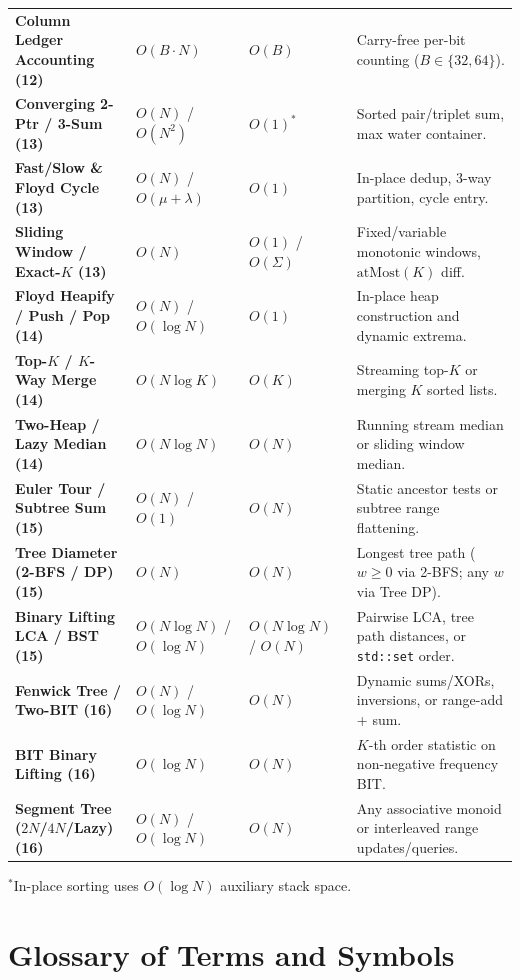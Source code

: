 \documentclass[11pt,a4paper]{article}
\begin{document}
\begin{xltabular}{\textwidth}{>{\raggedright\arraybackslash\bfseries}p{3.8cm} >{\centering\arraybackslash}p{2.6cm} >{\centering\arraybackslash}p{2.2cm} >{\raggedright\arraybackslash}X}
Column Ledger Accounting (12) & $O(B \cdot N)$ & $O(B)$ & Carry-free per-bit counting ($B \in \{32, 64\}$). \\
Converging 2-Ptr / 3-Sum (13) & $O(N)$ / $O(N^2)$ & $O(1)^*$ & Sorted pair/triplet sum, max water container. \\
Fast/Slow \& Floyd Cycle (13) & $O(N)$ / $O(\mu{+}\lambda)$ & $O(1)$ & In-place dedup, 3-way partition, cycle entry. \\
Sliding Window / Exact-$K$ (13) & $O(N)$ & $O(1)$ / $O(\Sigma)$ & Fixed/variable monotonic windows, $\text{atMost}(K)$ diff. \\
Floyd Heapify / Push / Pop (14) & $O(N)$ / $O(\log N)$ & $O(1)$ & In-place heap construction and dynamic extrema. \\
Top-$K$ / $K$-Way Merge (14) & $O(N \log K)$ & $O(K)$ & Streaming top-$K$ or merging $K$ sorted lists. \\
Two-Heap / Lazy Median (14) & $O(N \log N)$ & $O(N)$ & Running stream median or sliding window median. \\
Euler Tour / Subtree Sum (15) & $O(N)$ / $O(1)$ & $O(N)$ & Static ancestor tests or subtree range flattening. \\
Tree Diameter (2-BFS / DP) (15) & $O(N)$ & $O(N)$ & Longest tree path ($w \ge 0$ via 2-BFS; any $w$ via Tree DP). \\
Binary Lifting LCA / BST (15) & $O(N \log N)$ / $O(\log N)$ & $O(N \log N)$ / $O(N)$ & Pairwise LCA, tree path distances, or \texttt{std::set} order. \\
Fenwick Tree / Two-BIT (16) & $O(N)$ / $O(\log N)$ & $O(N)$ & Dynamic sums/XORs, inversions, or range-add + sum. \\
BIT Binary Lifting (16) & $O(\log N)$ & $O(N)$ & $K$-th order statistic on non-negative frequency BIT. \\
Segment Tree ($2N$/$4N$/Lazy) (16) & $O(N)$ / $O(\log N)$ & $O(N)$ & Any associative monoid or interleaved range updates/queries. \\
\end{xltabular}\endgroup
{\footnotesize\color{codegray}$^*$In-place sorting uses $O(\log N)$ auxiliary stack space.}

\section{Glossary of Terms and Symbols}
\end{document}
